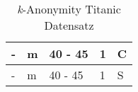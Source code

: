 \begin{table}[!htb]
\begin{tabular}{lllll}
\multicolumn{1}{|l|}{-}                                     & \multicolumn{1}{l|}{m}                                  & \multicolumn{1}{l|}{40 - 45}                       & \multicolumn{1}{l|}{1}                                      & \multicolumn{1}{l|}{C}                                          \\ \hline
\multicolumn{1}{|l|}{-}                                     & \multicolumn{1}{l|}{m}                                  & \multicolumn{1}{l|}{40 - 45}                       & \multicolumn{1}{l|}{1}                                      & \multicolumn{1}{l|}{S}                                          \\ \hline
\end{tabular}
\caption{\textit{k}-Anonymity Titanic Datensatz \cite{P-23}\cite{D-titanic}}
\label{tab:k-ano-titanic}
\end{table}